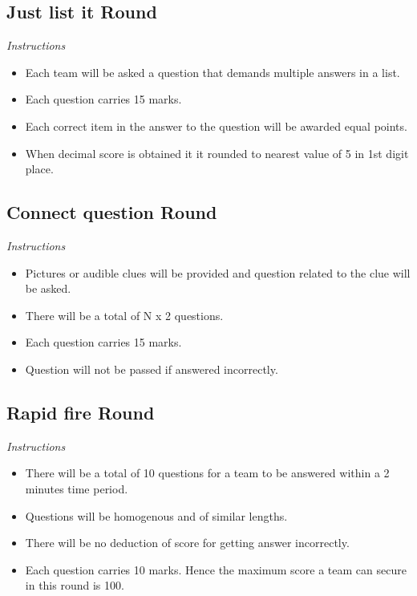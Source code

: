 \documentclass[a4paper,12pt]{exam}
\begin{document}
\subsection*{Just list it Round}

{\Large \textit{Instructions}}

\begin{itemize}
\item Each team will be asked a question that demands multiple answers in a list. 
\item Each question carries 15 marks.
\item Each correct item in the answer to the question will be awarded equal points.
\item When decimal score is obtained it it rounded to nearest value of 5 in 1st digit place.
\end{itemize}


\subsection*{Connect question Round}

{\Large \textit{Instructions}}

\begin{itemize}
\item Pictures or audible clues will be provided and question related to the clue will be asked. 
\item There will be a total of N x 2 questions.
\item Each question carries 15 marks.
\item Question will not be passed if answered incorrectly.
\end{itemize}

\subsection*{Rapid fire Round}

{\Large \textit{Instructions}}

\begin{itemize}
\item There will be a total of 10 questions for a team to be answered within a 2 minutes time period. 
\item Questions will be homogenous and of similar lengths.
\item There will be no deduction of score for getting answer incorrectly.
\item Each question carries 10 marks. Hence the maximum score a team can secure in this round is 100. 
\end{itemize}
\end{document}
